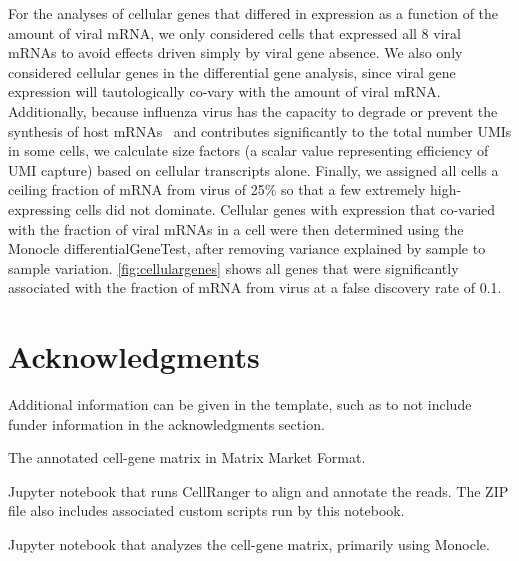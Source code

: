 \documentclass[9pt,lineno]{elife}
\begin{document}
For the analyses of cellular genes that differed in expression as a function of the amount of viral mRNA, we only considered cells that expressed all 8 viral mRNAs to avoid effects driven simply by viral gene absence.
We also only considered cellular genes in the differential gene analysis, since viral gene expression will tautologically co-vary with the amount of viral mRNA.
Additionally, because influenza virus has the capacity to degrade or prevent the synthesis of host mRNAs~\citep{BercovichKinori:2016iw} and contributes significantly to the total number UMIs in some cells, we calculate size factors (a scalar value representing efficiency of UMI capture) based on cellular transcripts alone. 
Finally, we assigned all cells a ceiling fraction of mRNA from virus of 25\% so that a few extremely high-expressing cells did not dominate. 
Cellular genes with expression that co-varied with the fraction of viral mRNAs in a cell were then determined using the Monocle differentialGeneTest, after removing variance explained by sample to sample variation. 
\ref{fig:cellulargenes} shows all genes that were significantly associated with the fraction of mRNA from virus at a false discovery rate of 0.1.

\section{Acknowledgments}

Additional information can be given in the template, such as to not include funder information in the acknowledgments section.

\nocite{*} %


\clearpage

\begin{suppfile}
\caption{\label{suppfile:cellgenematrix}
The annotated cell-gene matrix in Matrix Market Format.}
\end{suppfile}

\begin{suppfile}
\caption{\label{suppfile:alignandannotate}
Jupyter notebook that runs CellRanger to align and annotate the reads.
The ZIP file also includes associated custom scripts run by this notebook.}
\end{suppfile}

\begin{suppfile}
\caption{\label{suppfile:monocle}
Jupyter notebook that analyzes the cell-gene matrix, primarily using Monocle.}
\end{suppfile}
\end{document}
